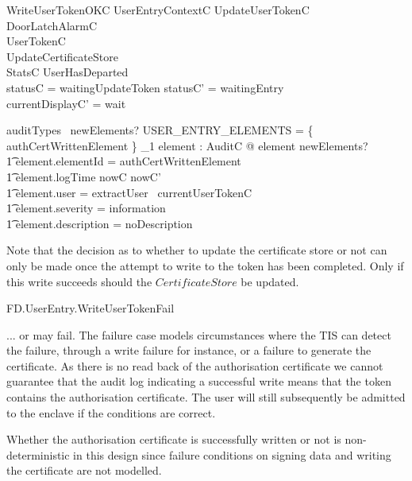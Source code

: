 \begin{schema}{WriteUserTokenOKC}
	UserEntryContextC
\also
        UpdateUserTokenC
\\	\Xi DoorLatchAlarmC
\\      \Xi UserTokenC
\\      UpdateCertificateStore
\\      \Xi StatsC
\where
        \lnot UserHasDeparted
\\	statusC = waitingUpdateToken
\also
        statusC' = waitingEntry
\\      currentDisplayC' = wait

\also
        auditTypes~ newElements? \cap USER\_ENTRY\_ELEMENTS = 
        \{ authCertWrittenElement \} 
\also
        \exists_1 element : AuditC @ element \in newElements? 
\\ \t1  \land element.elementId = authCertWrittenElement
\\ \t1  \land element.logTime \in nowC \upto nowC'
\\ \t1  \land element.user = extractUser~ currentUserTokenC
\\ \t1  \land element.severity = information
\\ \t1  \land element.description = noDescription
\end{schema}
\begin{Zcomment}
\item
Note that the decision as to whether to update the certificate store
or not can only be made once the attempt to write to the token has
been completed. Only if this write succeeds should the
$CertificateStore$ be updated.
\end{Zcomment}

\begin{traceunit}{FD.UserEntry.WriteUserTokenFail}
\end{traceunit}

... or may fail. The failure case models circumstances where the TIS
can detect the failure, through a write failure for instance, or a
failure to generate the certificate. 
As there is no read back of the authorisation certificate we cannot
guarantee that the audit log indicating a successful write means that
the token contains the authorisation certificate. The user will still
subsequently be admitted to the enclave if the conditions are correct. 

Whether the authorisation certificate is successfully
written or not is non-deterministic in this design since failure
conditions on signing data and writing the certificate are not modelled.   

